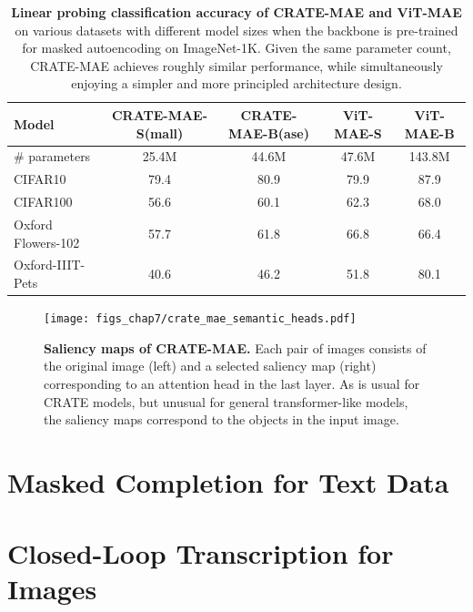 \documentclass[../../book-main.tex]{subfiles}
\begin{document}
\begin{table}
    \centering 
    \begin{tabular}{@{}lcc|cc@{}}
        \toprule 
        \textbf{Model} & CRATE-MAE-S(mall) & CRATE-MAE-B(ase) & {\color{gray} ViT-MAE-S} & {\color{gray} ViT-MAE-B} \\
        \midrule
        \midrule
        \# parameters & 25.4M & 44.6M & 47.6M & {\color{gray}143.8M} \\
        \midrule
        CIFAR10 & 79.4 & 80.9 & {\color{gray} 79.9} & {\color{gray} 87.9} \\
        CIFAR100 & 56.6 & 60.1 & {\color{gray} 62.3} & {\color{gray} 68.0} \\
        Oxford Flowers-102 & 57.7 & 61.8 & {\color{gray} 66.8} & {\color{gray} 66.4} \\
        Oxford-IIIT-Pets & 40.6 & 46.2 & {\color{gray} 51.8} & {\color{gray} 80.1} \\
        \bottomrule
    \end{tabular}
    \caption{\small\textbf{Linear probing classification accuracy of CRATE-MAE and ViT-MAE} on various datasets with different model sizes when the backbone is pre-trained for masked autoencoding on ImageNet-1K. Given the same parameter count, CRATE-MAE achieves roughly similar performance, while simultaneously enjoying a simpler and more principled architecture design.}
    \label{tab:crate_mae_linear_probing}
\end{table}

\begin{figure}
    \centering 
    \texttt{[image: figs\_chap7/crate\_mae\_semantic\_heads.pdf]}
    \caption{\small\textbf{Saliency maps of CRATE-MAE.} Each pair of images consists of the original image (left) and a selected saliency map (right) corresponding to an attention head in the last layer. As is usual for CRATE models, but unusual for general transformer-like models, the saliency maps correspond to the objects in the input image.}
    \label{fig:crate_mae_semantic_heads}
\end{figure}

\section{Masked Completion for Text Data}\label{sec:text_completion}

\section{Closed-Loop Transcription for Images}\label{sec:ctrl}
\end{document}

